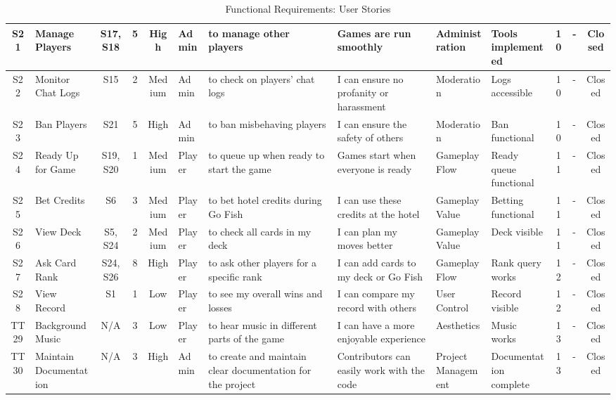 \begin{table}[h]
{\begin{tabular}{|c|p{3cm}|c|c|c|p{4cm}|p{4cm}|p{4cm}|p{4cm}|p{3cm}|c|p{3cm}|c|}
S21 & Manage Players & S17, S18 & 5 & High & Admin & to manage other players & Games are run smoothly & Administration & Tools implemented & 10 & - & Closed \\ \hline
S22 & Monitor Chat Logs & S15 & 2 & Medium & Admin & to check on players' chat logs & I can ensure no profanity or harassment & Moderation & Logs accessible & 10 & - & Closed \\ \hline
S23 & Ban Players & S21 & 5 & High & Admin & to ban misbehaving players & I can ensure the safety of others & Moderation & Ban functional & 10 & - & Closed \\ \hline
S24 & Ready Up for Game & S19, S20 & 1 & Medium & Player & to queue up when ready to start the game & Games start when everyone is ready & Gameplay Flow & Ready queue functional & 11 & - & Closed \\ \hline
S25 & Bet Credits & S6 & 3 & Medium & Player & to bet hotel credits during Go Fish & I can use these credits at the hotel & Gameplay Value & Betting functional & 11 & - & Closed \\ \hline
S26 & View Deck & S5, S24 & 2 & Medium & Player & to check all cards in my deck & I can plan my moves better & Gameplay Value & Deck visible & 11 & - & Closed \\ \hline
S27 & Ask Card Rank & S24, S26 & 8 & High & Player & to ask other players for a specific rank & I can add cards to my deck or Go Fish & Gameplay Flow & Rank query works & 12 & - & Closed \\ \hline
S28 & View Record & S1 & 1 & Low & Player & to see my overall wins and losses & I can compare my record with others & User Control & Record visible & 12 & - & Closed \\ \hline
TT29 & Background Music & N/A & 3 & Low & Player & to hear music in different parts of the game & I can have a more enjoyable experience & Aesthetics & Music works & 13 & - & Closed \\ \hline
TT30 & Maintain Documentation & N/A & 3 & High & Admin & to create and maintain clear documentation for the project & Contributors can easily work with the code & Project Management & Documentation complete & 13 & - & Closed \\ \hline
\end{tabular}
}
\caption{Functional Requirements: User Stories}
\label{tab:functional_user_stories}
\end{table}